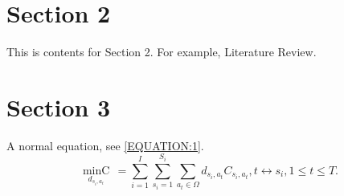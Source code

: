 \documentclass[a4paper,fleqn,11pt]{article}
\begin{document}
\section{Section 2}
This is contents for Section 2. For example, Literature Review.

\section{Section 3}

\begin{table}[htbp]
	\centering
	\caption{Table 1}
	\label{TABLE:1}
\end{table}

A normal equation, see \eqref{EQUATION:1}.
\begin{equation}\label{EQUATION:1}
	\underset{{{d}_{{{s}_{i}},{{a}_{t}}}}}{\mathop{\min C}}\,=\sum\limits_{i=1}^{I}{\sum\limits_{{{s}_{i}}=1}^{{{S}_{i}}}{\sum\limits_{{{a}_{t}}\in {\Omega}}^{{}}{{{d}_{{{s}_{i}},{{a}_{t}}}}{{C}_{{{s}_{i}},{{a}_{t}}}}}}}, t \leftrightarrow {{s}_{i}}, 1\le t\le T.
\end{equation}
\end{document}

